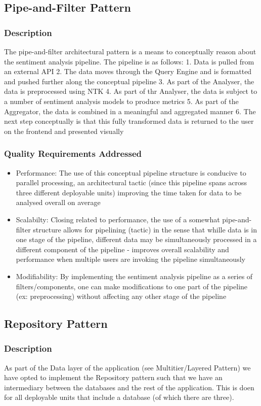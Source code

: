 \documentclass[12pt]{article}
\begin{document}
\subsection{Pipe-and-Filter Pattern}
\subsubsection{Description}
The pipe-and-filter architectural pattern is a means to conceptually reason about the sentiment analysis pipeline. The pipeline is as follows: 1. Data is pulled from an external API 2. The data moves through the Query Engine and is formatted and pushed further along the conceptual pipeline 3. As part of the Analyser, the data is preprocessed using NTK 4. As part of thr Analyser, the data is subject to a number of sentiment analysis models to produce metrics 5. As part of the Aggregator, the data is combined in a meaningful and aggregated manner 6. The next step conceptually is that this fully transformed data is returned to the user on the frontend and presented visually
\subsubsection{Quality Requirements Addressed}
\begin{itemize}
    \item Performance: The use of this conceptual pipeline structure is conducive to parallel processing, an architectural tactic (since this pipeline spans across three different deployable units) improving the time taken for data to be analysed overall on average
    \item Scalabilty: Closing related to performance, the use of a somewhat pipe-and-filter structure allows for pipelining (tactic) in the sense that whille data is in one stage of the pipeline, different data may be simultaneously processed in a different component of the pipeline - improves overall scalability and performance when multiple users are invoking the pipeline simultaneously
    \item Modifiability: By implementing the sentiment analysis pipeline as a series of filters/components, one can make modifications to one part of the pipeline (ex: preprocessing) without affecting any other stage of the pipeline
\end{itemize}
\subsection{Repository Pattern}
\subsubsection{Description}
As part of the Data layer of the application (see Multitier/Layered Pattern) we have opted to implement the Repository pattern such that we have an intermediary between the databases and the rest of the application. This is doen for all deployable units that include a database (of which there are three).
\end{document}
